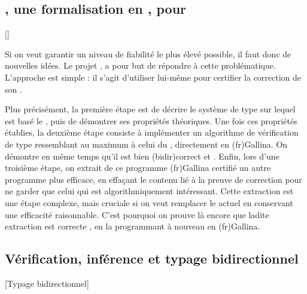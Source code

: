 \subsection{, une formalisation en , pour }[]
\label{sec:intro-metacoq}


Si on veut garantir un niveau de fiabilité le plus élevé possible, il faut donc de nouvelles idées.
Le projet , a pour but de répondre à cette problématique.
L’approche est simple : il s’agit d’utiliser  lui-même pour certifier la correction de son .

Plus précisément, la première étape est de décrire le système de type sur lequel est basé le , puis de démontrer ses propriétés théoriques.
Une fois ces propriétés établies, la deuxième étape
consiste à implémenter un algorithme de vérification de type ressemblant au maximum à celui du , directement en \kl(fr){Gallina}.
On démontre en même temps qu’il est bien \reintro(bidir){correct}%
et %
.
Enfin, lors d’une troisième étape, on extrait de ce programme \kl(fr){Gallina} certifié
un autre programme plus efficace, en effaçant le contenu lié à la preuve de correction
pour ne garder que celui qui est algorithmiquement intéressant.
Cette extraction est une étape complexe,
mais cruciale si on veut remplacer le  actuel en conservant une
efficacité raisonnable.
C’est pourquoi on prouve là encore que ladite extraction est correcte%
,
en la programmant à nouveau en \kl(fr){Gallina}.

\subsection{Vérification, inférence et typage bidirectionnel}[Typage bidirectionnel]

